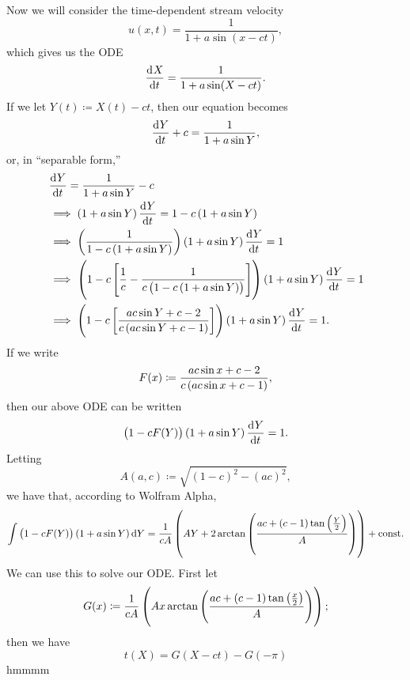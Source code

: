 \documentclass{article}
\begin{document}
Now we will consider the time-dependent stream velocity
%
\begin{equation*}
    u(x, t) = \frac{1}{1 + a \sin (x - c t)}
    ,
\end{equation*}
%
which gives us the ODE
%
\begin{equation*}
    \dod{X}{t} = \frac{1}{1 + a \sin (X - c t)}
    .
\end{equation*}
%
If we let $Y(t) \coloneqq X(t) - c t$, then our equation becomes
%
\begin{equation*}
    \dod{Y}{t} + c = \frac{1}{1 + a \sin Y}
    ,
\end{equation*}
%
or, in ``separable form,''
%
\begin{align*}
    &\dod{Y}{t} = \frac{1}{1 + a \sin Y} - c \\
    &\implies \del{1 + a \sin Y} \dod{Y}{t} = 1 - c \del{1 + a \sin Y} \\
    &\implies \del{\frac{1}{1 - c \del{1 + a \sin Y}}} \del{1 + a \sin Y} \dod{Y}{t} = 1 \\
    &\implies \del{1 - c \sbr{\frac{1}{c} - \frac{1}{c \del{1 - c \del{1 + a \sin Y}}}}} \del{1 + a \sin Y} \dod{Y}{t} = 1 \\
    &\implies \del{1 - c \sbr{\frac{a c \sin Y + c - 2}{c \del{a c \sin Y + c - 1}}}} \del{1 + a \sin Y} \dod{Y}{t} = 1
    .
\end{align*}
%
If we write
%
\begin{equation*}
    F(x) \coloneqq \frac{a c \sin x + c - 2}{c \del{a c \sin x + c - 1}}
    ,
\end{equation*}
%
then our above ODE can be written
%
\begin{equation*}
    \del{1 - c F(Y)} \del{1 + a \sin Y} \dod{Y}{t} = 1
    .
\end{equation*}
%
Letting
%
\begin{equation*}
    A(a, c) \coloneqq \sqrt{(1 - c)^2 - (ac)^2}
    ,
\end{equation*}
%
we have that, according to Wolfram Alpha,
%
\begin{equation*}
    \int \del{1 - c F(Y)} \del{1 + a \sin Y} \dif {Y}
        = \frac{1}{c A}
        \del{
            A Y + 2 \arctan
                \del{\frac{a c + (c - 1) \tan \del{\frac{Y}{2}}}{A}}
            } + \text{const}
    .
\end{equation*}
%
We can use this to solve our ODE. First let
%
\begin{equation*}
    G(x) \coloneqq
        \frac{1}{c A}
        \del{
            A x \arctan
                \del{\frac{a c + (c - 1) \tan \del{\frac{x}{2}}}{A}}
            }
    ;
\end{equation*}
%
then we have
%
\begin{equation*}
    t(X) = G(X - c t) - G(-\pi)
\end{equation*}
%
hmmmm
\end{document}
